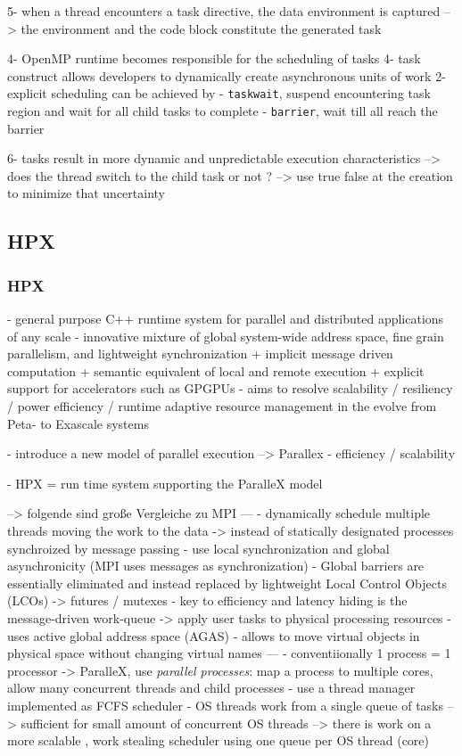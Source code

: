   5- when a thread encounters a task directive, the data environment is captured
  		--> the environment and the code block constitute the generated task


  4- OpenMP runtime becomes responsible for the scheduling of tasks
  4- task construct allows developers to dynamically create asynchronous units of work
  2- explicit scheduling can be achieved by 
      - \texttt{taskwait}, suspend encountering task region and wait for all child tasks to complete
      - \texttt{barrier}, wait till all reach the barrier

  6- tasks result in more dynamic and unpredictable execution characteristics
  	--> does the thread switch to the child task or not ? --> use true false at the creation to minimize that uncertainty


\subsection{HPX}
\subsubsection{HPX}
  \cite{Kaiser.2014}
  - general purpose C++ runtime system for parallel and distributed applications of any scale
  - innovative mixture of global system-wide address space, fine grain parallelism, and lightweight synchronization
    + implicit message driven computation
    + semantic equivalent of local and remote execution
    + explicit support for accelerators such as GPGPUs
  - aims to resolve scalability / resiliency / power efficiency / runtime adaptive resource management in the evolve from Peta- to Exascale systems
  
\cite{Kaiser.2009}
  - introduce a new model of parallel execution --> Parallex
    - efficiency / scalability
    
  - HPX = run time system supporting the ParalleX model
  
--> folgende sind große Vergleiche zu MPI ---
    - dynamically schedule multiple threads moving the work to the data
     -> instead of statically designated processes synchroized by message passing
    - use local synchronization and global asynchronicity (MPI uses messages as synchronization)
    - Global barriers are essentially eliminated and instead replaced by
lightweight Local Control Objects (LCOs) -> futures / mutexes
    - key to efficiency and latency hiding is the message-driven work-queue
	  -> apply user tasks to physical processing resources
	- uses active global address space (AGAS)
	  - allows to move virtual objects in physical space without changing virtual names
	  ---
	- conventiionally 1 process = 1 processor
	  -> ParalleX, use \textit{parallel processes}: map a process to multiple cores, allow many concurrent threads and child processes
	- use a thread manager implemented as FCFS scheduler 
	  - OS threads work from a single queue of tasks 
	  --> sufficient for small amount of concurrent OS threads
	  --> there is work on a more scalable , work stealing scheduler using one queue per OS thread (core)
	  

